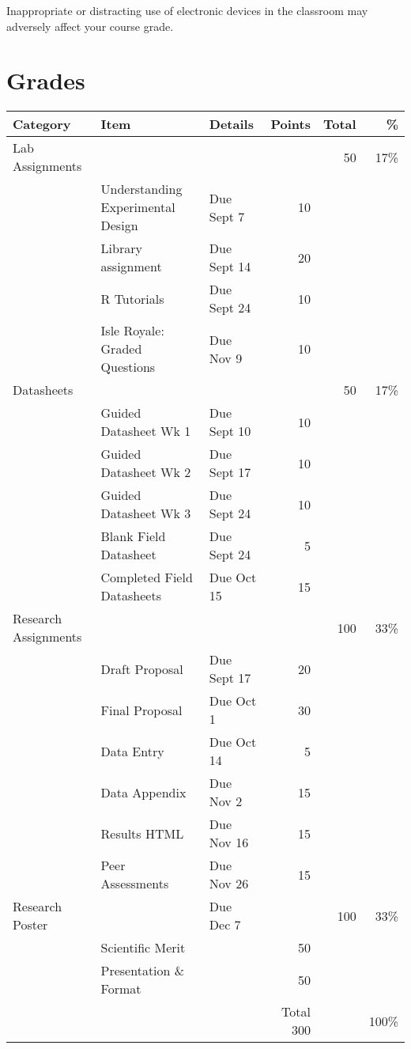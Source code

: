 \documentclass{tufte-handout}
\begin{document}
\begin{fullwidth}
Inappropriate or distracting use of electronic devices in the classroom may adversely affect your course grade. 

\section{Grades}













				

\begin{tabular}{l l l r r r}
Category & Item & Details & Points  & Total & \% \\
\hline
Lab Assignments & & &  & 50 & 17\% \\
& Understanding Experimental Design & Due Sept 7 &10 \\
& Library assignment & Due Sept 14 & 20 \\
& R Tutorials & Due Sept 24 & 10 \\
& Isle Royale: Graded Questions & Due Nov 9 & 10 \\
\hline
Datasheets & & &  & 50 & 17\% \\
& Guided Datasheet Wk 1 & Due Sept 10 & 10 \\
& Guided Datasheet Wk 2 & Due Sept 17 & 10 \\
& Guided Datasheet Wk 3 & Due Sept 24 & 10 \\
& Blank Field Datasheet & Due Sept 24 & 5 \\
& Completed Field Datasheets & Due Oct 15 & 15 \\
\hline
Research Assignments & & & & 100 & 33\% \\
& Draft Proposal & Due Sept 17 & 20 \\
& Final Proposal & Due Oct 1 & 30 \\
& Data Entry & Due Oct 14 & 5 \\
& Data Appendix & Due Nov 2 & 15 \\
& Results HTML & Due Nov 16 & 15 \\
& Peer Assessments & Due Nov 26 & 15 \\
\hline
Research Poster & & Due Dec 7& & 100 & 33\% \\
& Scientific Merit &  & 50 \\
&  Presentation \& Format && 50 \\
\hline 
& & & Total 300 & & 100\% \\
\end{tabular}


\end{fullwidth}
\end{document}
